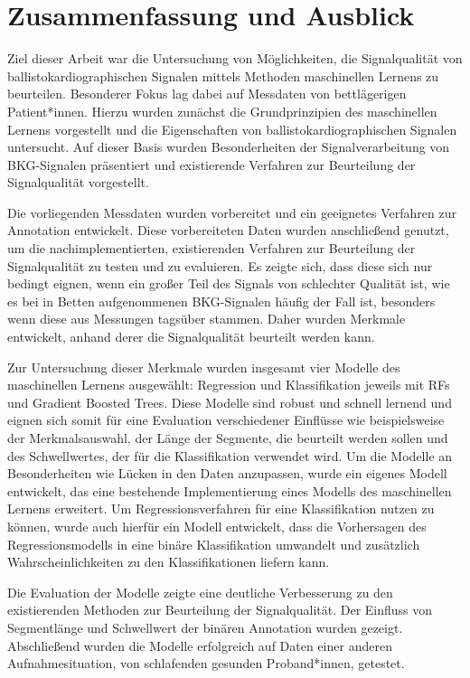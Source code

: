 \chapter{Zusammenfassung und Ausblick}\label{zusammenfassung}

Ziel dieser Arbeit war die Untersuchung von Möglichkeiten, die Signalqualität von ballistokardiographischen Signalen mittels Methoden maschinellen Lernens zu beurteilen. Besonderer Fokus lag dabei auf Messdaten von bettlägerigen Patient*innen. Hierzu wurden zunächst die Grundprinzipien des maschinellen Lernens vorgestellt und die Eigenschaften von ballistokardiographischen Signalen untersucht. Auf dieser Basis wurden Besonderheiten der Signalverarbeitung von \ac{BKG}-Signalen präsentiert und existierende Verfahren zur Beurteilung der Signalqualität vorgestellt.

Die vorliegenden Messdaten wurden vorbereitet und ein geeignetes Verfahren zur Annotation entwickelt. Diese vorbereiteten Daten wurden anschließend genutzt, um die nachimplementierten, existierenden Verfahren zur Beurteilung der Signalqualität zu testen und zu evaluieren. Es zeigte sich, dass diese sich nur bedingt eignen, wenn ein großer Teil des Signals von schlechter Qualität ist, wie es bei in Betten aufgenommenen \ac{BKG}-Signalen häufig der Fall ist, besonders wenn diese aus Messungen tagsüber stammen. Daher wurden Merkmale entwickelt, anhand derer die Signalqualität beurteilt werden kann.

Zur Untersuchung dieser Merkmale wurden insgesamt vier Modelle des maschinellen Lernens ausgewählt: Regression und Klassifikation jeweils mit \acl{RF}s und Gradient Boosted Trees. Diese Modelle sind robust und schnell lernend und eignen sich somit für eine Evaluation verschiedener Einflüsse wie beispielsweise der Merkmalsauswahl, der Länge der Segmente, die beurteilt werden sollen und des Schwellwertes, der für die Klassifikation verwendet wird. Um die Modelle an Besonderheiten wie Lücken in den Daten anzupassen, wurde ein eigenes Modell entwickelt, das eine bestehende Implementierung eines Modells des maschinellen Lernens erweitert. Um Regressionsverfahren für eine Klassifikation nutzen zu können, wurde auch hierfür ein Modell entwickelt, dass die Vorhersagen des Regressionsmodells in eine binäre Klassifikation umwandelt und zusätzlich Wahrscheinlichkeiten zu den Klassifikationen liefern kann.

Die Evaluation der Modelle zeigte eine deutliche Verbesserung zu den existierenden Methoden zur Beurteilung der Signalqualität. Der Einfluss von Segmentlänge und Schwellwert der binären Annotation wurden gezeigt. Abschließend wurden die Modelle erfolgreich auf Daten einer anderen Aufnahmesituation, von schlafenden gesunden Proband*innen, getestet.

